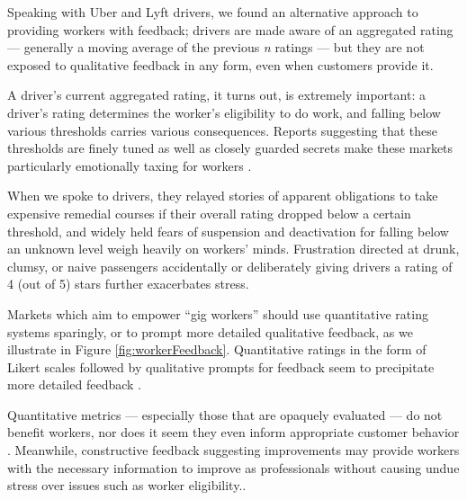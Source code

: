 Speaking with Uber and Lyft drivers, we found an alternative approach to providing workers with feedback;
drivers are made aware of an aggregated rating
--- generally a moving average of the previous \textit{n} ratings ---
but they are not exposed to qualitative feedback in any form, even when customers provide it.

A driver's current aggregated rating, it turns out, is extremely important:
a driver's rating determines the worker's eligibility to do work, and falling below various thresholds carries various consequences. Reports suggesting that these thresholds are finely tuned as well as closely guarded secrets make these markets particularly emotionally taxing for workers \cite{leakedUber}.

When we spoke to drivers, they relayed stories of apparent obligations to take expensive remedial courses if their overall rating dropped below a certain threshold,
and widely held fears of suspension and deactivation for falling below an unknown level weigh heavily on workers' minds.
Frustration directed at drunk, clumsy, or naive passengers accidentally or deliberately giving drivers a rating of 4 (out of 5) stars further exacerbates stress.

Markets which aim to empower ``gig workers'' should use quantitative rating systems sparingly,
or to prompt more detailed qualitative feedback, as we illustrate in Figure
\ref{fig:workerFeedback}.
Quantitative ratings in the form of Likert scales followed by qualitative prompts for feedback seem to precipitate more detailed feedback
\cite{numericCritique}.

Quantitative metrics --- especially those that are opaquely evaluated --- do not benefit workers, nor does it seem they even inform appropriate customer behavior \cite{ebayRatings}.
Meanwhile, constructive feedback suggesting improvements may provide workers with the necessary information to improve as professionals without causing undue stress over issues such as worker eligibility..